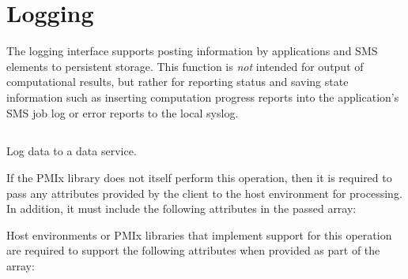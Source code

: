 \section{Logging}
\label{chap:api_job_mgmt:logging}

The logging interface supports posting information by applications and SMS elements to persistent storage. This function is \textit{not} intended for output of computational results, but rather for reporting status and saving state information such as inserting computation progress reports into the application's \ac{SMS} job log or error reports to the local syslog.

\subsection{}

\summary

Log data to a data service.

\format


\begin{arglist}
\end{arglist}

\returnsimple

\reqattrstart
If the \ac{PMIx} library does not itself perform this operation, then it is required to pass any attributes provided by the client to the host environment for processing. In addition, it must include the following attributes in the passed  array:


Host environments or \ac{PMIx} libraries that implement support for this operation are required to support the following attributes when provided as part of the  array:

